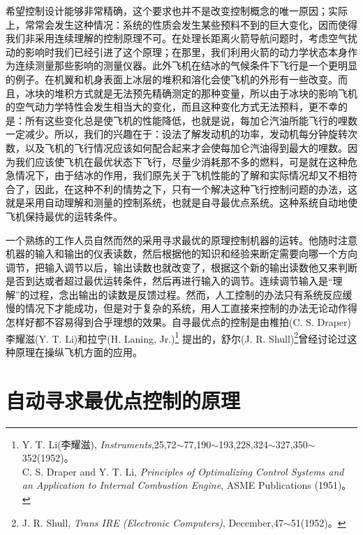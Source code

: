 希望控制设计能够非常精确，这个要求也并不是改变控制概念的唯一原因；实际上，常常会发生这种情况：系统的性质会发生某些预料不到的巨大变化，因而使得我们非采用连续理解的控制原理不可。在处理长距离火箭导航问题时，考虑空气扰动的影响时我们已经引进了这个原理；在那里，我们利用火箭的动力学状态本身作为连续测量那些影响的测量仪器。此外飞机在结冰的气候条件下飞行是一个更明显的例子。在机翼和机身表面上冰层的堆积和溶化会使飞机的外形有一些改变。而且，冰块的堆积方式就是无法预先精确测定的那种变量，所以由于冰块的影响飞机的空气动力学特性会发生相当大的变化，而且这种变化方式无法预料，更不幸的是：所有这些变化总是使飞机的性能降低，也就是说，每加仑汽油所能飞行的哩数一定减少。所以，我们的兴趣在于：设法了解发动机的功率，发动机每分钟旋转次数，以及飞机的飞行情况应该如何配合起来才会使每加仑汽油得到最大的哩数。因为我们应该使飞机在最优状态下飞行，尽量少消耗那不多的燃料，可是就在这种危急情况下，由于结冰的作用，我们原先关于飞机性能的了解和实际情况却又不相符合了，因此，在这种不利的情势之下，只有一个解决这种飞行控制问题的办法，这就是采用自动理解和测量的控制系统，也就是自寻最优点系统。这种系统自动地使飞机保持最优的运转条件。

一个熟练的工作人员自然而然的采用寻求最优的原理控制机器的运转。他随时注意机器的输入和输出的仪表读数，然后根据他的知识和经验来断定需要向哪一个方向调节，把输入调节以后，输出读数也就改变了，根据这个新的输出读数他又来判断是否到达或者超过最优运转条件，然后再进行输入的调节。连续调节输入是“理解”的过程，念出输出的读数是反馈过程。然而，人工控制的办法只有系统反应缓慢的情况下才能成功，但是对于复杂的系统，用人工直接来控制的办法无论动作得怎样好都不容易得到合乎理想的效果。自寻最优点的控制是由椎拍(C. S. Draper)李耀滋(Y. T. Li)和拉宁(H. Laning, Jr.)\footnote{Y. T. Li(李耀滋), \textit{Instruments},25,72$\sim$77,190$\sim$193,228,324$\sim$327,350$\sim$352(1952)。\\C. S. Draper and Y. T. Li, \textit{Principles of Optimalizing Control Systems and an Application to Internal Combustion Engine}, ASME Publications (1951)。} 提出的，舒尔(J. R. Shull)\footnote{J. R. Shull, \textit{Trans IRE (Electronic Computers)}, December,47$\sim$51(1952)。}曾经讨论过这种原理在操纵飞机方面的应用。


\section{自动寻求最优点控制的原理}

